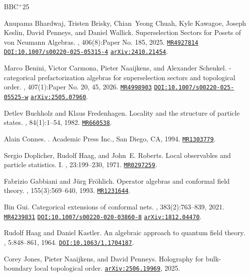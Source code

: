 \documentclass[11pt,reqno]{amsart}
\newcommand{\arxiv}[1]{\href{http://arxiv.org/abs/#1}{\tt arXiv:\nolinkurl{#1}}}
\newcommand{\mathscinet}[1]{\href{http://www.ams.org/mathscinet-getitem?mr=#1}{\tt #1}}
\newcommand{\doi}[1]{\href{http://dx.doi.org/#1}{{\tt DOI:#1}}}
\numberwithin{equation}{section}
\theoremstyle{plain}
\theoremstyle{definition}
\begin{document}
\newcommand{\etalchar}[1]{$^{#1}$}
\begin{thebibliography}{BBC{\etalchar{+}}25}

\bibitem[BBC{\etalchar{+}}25]{MR4927814}
Anupama Bhardwaj, Tristen Brisky, Chian~Yeong Chuah, Kyle Kawagoe, Joseph Keslin, David Penneys, and Daniel Wallick.
\newblock Superselection {S}ectors for {P}osets of von {N}eumann {A}lgebras.
, 406(8):Paper No. 185, 2025.
\newblock \mathscinet{MR4927814} \doi{10.1007/s00220-025-05315-4} \arxiv{2410.21454}.

Marco Benini, Victor Carmona, Pieter Naaijkens, and Alexander Schenkel.
-categorical prefactorization algebras for superselection sectors and topological order.
, 407(1):Paper No. 20, 45, 2026.
\newblock \mathscinet{MR4998903} \doi{10.1007/s00220-025-05525-w} \arxiv{2505.07960}.

Detlev Buchholz and Klaus Fredenhagen.
\newblock Locality and the structure of particle states.
, 84(1):1--54, 1982.
\newblock \mathscinet{MR660538}.

Alain Connes.
.
\newblock Academic Press Inc., San Diego, CA, 1994.
\newblock \mathscinet{MR1303779}.

Sergio Doplicher, Rudolf Haag, and John~E. Roberts.
\newblock Local observables and particle statistics. {I}.
, 23:199--230, 1971.
\newblock \mathscinet{MR0297259}.

Fabrizio Gabbiani and J\"{u}rg Fr\"{o}hlich.
\newblock Operator algebras and conformal field theory.
, 155(3):569--640, 1993.
\newblock \mathscinet{MR1231644}.

Bin Gui.
\newblock Categorical extensions of conformal nets.
, 383(2):763--839, 2021.
\newblock \mathscinet{MR4239831} \doi{10.1007/s00220-020-03860-8} \arxiv{1812.04470}.

Rudolf Haag and Daniel Kastler.
\newblock An algebraic approach to quantum field theory.
, 5:848--861, 1964.
\newblock \doi{10.1063/1.1704187}.

Corey Jones, Pieter Naaijkens, and David Penneys.
\newblock Holography for bulk-boundary local topological order.
\newblock \arxiv{2506.19969}, 2025.


\end{thebibliography}
\end{document}

